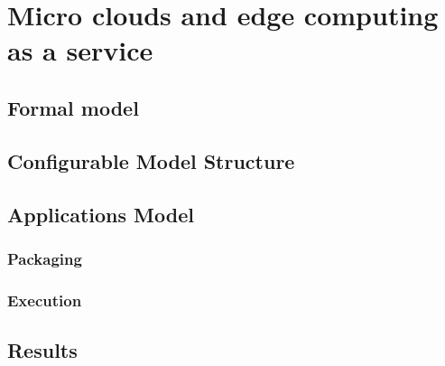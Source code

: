\chapter{Micro clouds and edge computing as a service}\label{chapter:Micro_clouds}
%
%
%



\section{Formal model}\label{sec:formal_model}
%
%



\section{Configurable Model Structure}\label{sec:configurable_model_structure}
%
%



\section{Applications Model}\label{sec:application_model}
%
%



\subsection{Packaging}\label{sec:packaging}
%
%



\subsection{Execution}\label{sec:execution}
%
%



\section{Results}\label{sec:Results}
%
%


